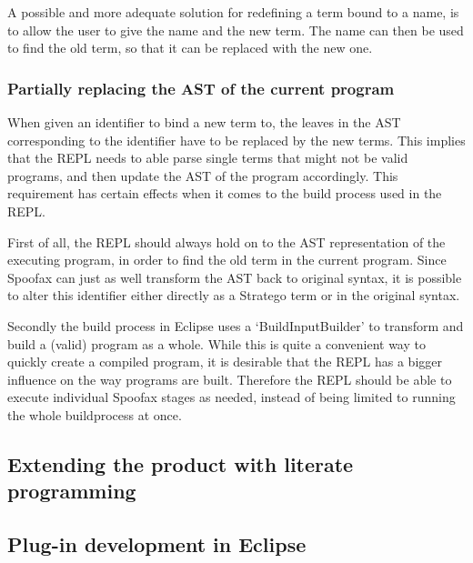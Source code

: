 A possible and more adequate solution for redefining a term bound to a
name, is to allow the user to give the name and the new term. The name
can then be used to find the old term, so that it can be replaced with
the new one.

\subsubsection{Partially replacing the AST of the current program}
When given an identifier to bind a new term to, the leaves in the AST
corresponding to the identifier have to be replaced by the new terms.
This implies that the REPL needs to able parse single terms that might
not be valid programs, and then update the AST of the program accordingly.
This requirement has certain effects when it comes to the build process
used in the REPL.

First of all, the REPL should always hold on to the AST representation of the
executing program, in order to find the old term in the current program.
Since Spoofax can just as well transform the AST back to original syntax,
it is possible to alter this identifier either directly as a Stratego term or
in the original syntax.

Secondly the build process in Eclipse uses a `BuildInputBuilder' to transform
and build a (valid) program as a whole. While this is quite a convenient way to
quickly create a compiled program, it is desirable that the REPL has a bigger
influence on the way programs are built.
Therefore the REPL should be able to execute individual Spoofax stages
as needed, instead of being limited to running the whole buildprocess at once.

\subsection{Extending the product with literate programming}
\label{sec:extend-prod-with}

\subsection{Plug-in development in Eclipse}
\label{ssec:eclipse-plugins}

